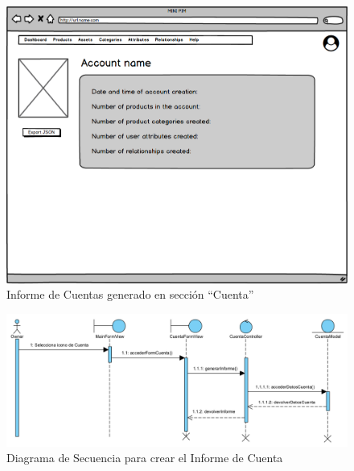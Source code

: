 \begin{figure}[H]
    \includegraphics[width=1\linewidth]{assets/mockups/RF1.9CrearInformeCuenta.png}
    \caption{Informe de Cuentas generado en sección \enquote{Cuenta}}
   \end{figure}
\vspace{1.0cm}

\newpage %

\begin{figure}[H]
    \includegraphics[width=1\linewidth]{assets/sequence/RF1.9_CrearInformeCuenta_v5.png}
    \caption{Diagrama de Secuencia para crear el Informe de Cuenta}
   \end{figure}
\vspace{1.0cm}

\newpage %